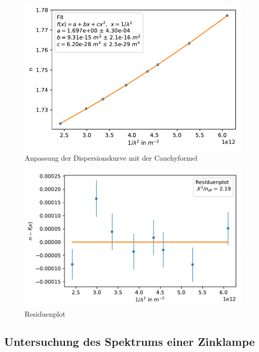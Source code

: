 \documentclass[12pt,a4paper]{article}
\begin{document}
{\begin{figure}
	\centering
	\includegraphics[scale=1]{Python/CdHg_LinReg.pdf}
	\caption{Anpassung der Dispersionskurve mit der Cauchyformel}
	\label{CdHg_LinReg}
\end{figure}

\begin{figure}
	\centering
	\includegraphics[scale=1]{Python/CdHg_Residuen.pdf}
	\caption{Residuenplot}
	\label{CdHg_Residuenplot}
\end{figure}

\subsection{Untersuchung des Spektrums einer Zinklampe}

}
\end{document}

